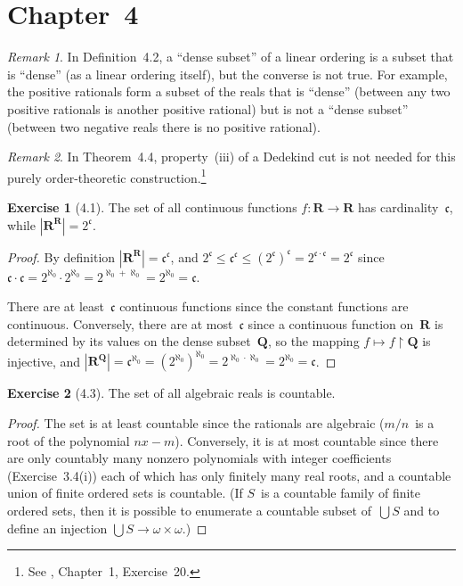 \documentclass[letterpaper,12pt]{article}
\newcommand{\Q}{\boldsymbol{Q}}
\newcommand{\R}{\boldsymbol{R}}
\newcommand{\cc}{\mathfrak{c}}
\newcommand{\bigunion}{\bigcup}
\newcommand{\mult}{\cdot}
\newcommand{\card}[1]{|#1|}
\theoremstyle{definition}
\newtheorem*{exer}{Exercise}
\theoremstyle{remark}
\newtheorem*{rmk}{Remark}
\begin{document}
\section*{Chapter~4}
\begin{rmk}
In Definition~4.2, a ``dense subset'' of a linear ordering is a subset that is ``dense'' (as a linear ordering itself), but the converse is not true. For example, the positive rationals form a subset of the reals that is ``dense'' (between any two positive rationals is another positive rational) but is not a ``dense subset'' (between two negative reals there is no positive rational).
\end{rmk}

\begin{rmk}
In Theorem~4.4, property~(iii) of a Dedekind cut is not needed for this purely order-theoretic construction.\footnote{See \cite{rudin}, Chapter~1, Exercise~20.}
\end{rmk}

\begin{exer}[4.1]
The set of all continuous functions \(f:\R\to\R\) has cardinality~\(\cc\), while \(\card{\R^{\R}}=2^{\cc}\).
\end{exer}
\begin{proof}
By definition \(\card{\R^{\R}}=\cc^{\cc}\), and \(2^{\cc}\le\cc^{\cc}\le(2^{\cc})^{\cc}=2^{\cc\mult\cc}=2^{\cc}\) since \(\cc\mult\cc=2^{\aleph_0}\mult 2^{\aleph_0}=2^{\aleph_0+\aleph_0}=2^{\aleph_0}=\cc\).

There are at least~\(\cc\) continuous functions since the constant functions are continuous. Conversely, there are at most~\(\cc\) since a continuous function on~\(\R\) is determined by its values on the dense subset~\(\Q\), so the mapping \(f\mapsto f\restriction\Q\) is injective, and \(\card{\R^{\Q}}=\cc^{\aleph_0}=(2^{\aleph_0})^{\aleph_0}=2^{\aleph_0\mult\aleph_0}=2^{\aleph_0}=\cc\).
\end{proof}

\begin{exer}[4.3]
The set of all algebraic reals is countable.
\end{exer}
\begin{proof}
The set is at least countable since the rationals are algebraic (\(m/n\)~is a root of the polynomial \(nx-m\)). Conversely, it is at most countable since there are only countably many nonzero polynomials with integer coefficients (Exercise~3.4(i)) each of which has only finitely many real roots, and a countable union of finite ordered sets is countable. (If \(S\)~is a countable family of finite ordered sets, then it is possible to enumerate a countable subset of~\(\bigunion S\) and to define an injection \(\bigunion S\to\omega\times\omega\).)
\end{proof}
\end{document}
